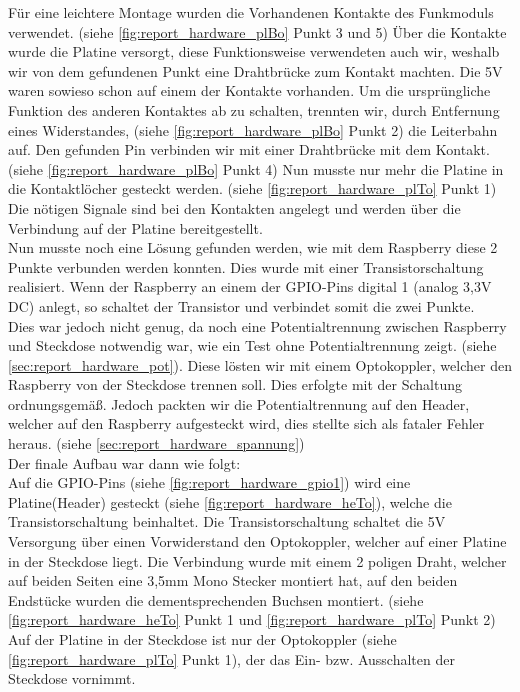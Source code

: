 Für eine leichtere Montage wurden die Vorhandenen Kontakte des Funkmoduls verwendet. (siehe \autoref{fig:report_hardware_plBo} Punkt 3 und 5) Über die Kontakte wurde die Platine versorgt, diese Funktionsweise verwendeten auch wir, weshalb wir von dem gefundenen Punkt eine Drahtbrücke zum Kontakt machten. Die 5V waren sowieso schon auf einem der Kontakte vorhanden. Um die ursprüngliche Funktion des anderen Kontaktes ab zu schalten, trennten wir, durch Entfernung eines Widerstandes, (siehe \autoref{fig:report_hardware_plBo} Punkt 2) die Leiterbahn auf. Den gefunden Pin verbinden wir mit einer Drahtbrücke mit dem Kontakt. (siehe \autoref{fig:report_hardware_plBo} Punkt 4) Nun musste nur mehr die Platine in die Kontaktlöcher gesteckt werden. (siehe \autoref{fig:report_hardware_plTo} Punkt 1) Die nötigen Signale sind bei den Kontakten angelegt und werden über die Verbindung auf der Platine bereitgestellt.\\
Nun musste noch eine Lösung gefunden werden, wie mit dem Raspberry diese 2 Punkte verbunden werden konnten. Dies wurde mit einer Transistorschaltung realisiert. Wenn der Raspberry an einem der GPIO-Pins digital 1 (analog 3,3V DC) anlegt, so schaltet der Transistor und verbindet somit die zwei Punkte. \\
Dies war jedoch nicht genug, da noch eine Potentialtrennung zwischen Raspberry und Steckdose  notwendig war, wie ein Test ohne Potentialtrennung zeigt. (siehe \autoref{sec:report_hardware_pot}). Diese lösten wir mit einem Optokoppler, welcher den Raspberry von der Steckdose trennen soll. Dies erfolgte mit der Schaltung ordnungsgemäß. Jedoch packten wir die Potentialtrennung auf den Header, welcher auf den Raspberry aufgesteckt wird, dies stellte sich als fataler Fehler heraus. (siehe \autoref{sec:report_hardware_spannung})\\
Der finale Aufbau war dann wie folgt:\\
Auf die GPIO-Pins (siehe \autoref{fig:report_hardware_gpio1}) wird eine Platine(Header) gesteckt (siehe \autoref{fig:report_hardware_heTo}), welche die Transistorschaltung beinhaltet. Die Transistorschaltung schaltet die 5V Versorgung über einen Vorwiderstand den Optokoppler, welcher auf einer Platine in der Steckdose liegt. Die Verbindung wurde mit einem 2 poligen Draht, welcher auf beiden Seiten eine 3,5mm Mono Stecker montiert hat, auf den beiden Endstücke wurden die dementsprechenden Buchsen montiert. (siehe \autoref{fig:report_hardware_heTo} Punkt 1 und \autoref{fig:report_hardware_plTo} Punkt 2) Auf der Platine in der Steckdose ist nur der Optokoppler (siehe \autoref{fig:report_hardware_plTo} Punkt 1), der das Ein- bzw. Ausschalten der Steckdose vornimmt.\\
